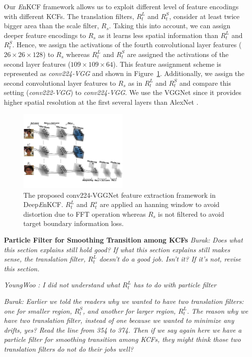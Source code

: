 \documentclass[10pt,twocolumn,letterpaper]{article}
\begin{document}
Our {\it E}nKCF framework allows us to exploit different level of
feature encodings with different KCFs. The translation filters,
$R_{t}^{L}$ and $R_{t}^{S}$, consider at least twice bigger area than
the scale filter, $R_{s}$. Taking this into account, we can assign deeper feature
encodings to $R_{s}$ as it learns less spatial information than
$R_{t}^{L}$ and $R_{t}^{S}$. Hence, we assign the activations of the
fourth convolutional layer features ($26\times26\times128$) to $R_{s}$
whereas $R_{t}^{L}$ and $R_{t}^{S}$ are assigned the activations of
the second layer features ($109\times109\times64$). This feature
assignment scheme is represented as \textit{conv224-VGG} and shown in
Figure~\ref{fig:Filters_CNN}. Additionally, we assign the second
convolutional layer features to $R_{s}$ as in $R_{t}^{L}$ and
$R_{t}^{S}$ and compare this setting (\textit{conv222-VGG}) to
\textit{conv224-VGG}. We use the VGGNet since it provides higher spatial
resolution at the first several layers than AlexNet
\cite{krizhevsky2012imagenet}.

\begin{figure}[!h]
\centering
\includegraphics[width=0.48\textwidth]{./figures/Filters_Details_CNN.pdf}
\caption{The proposed conv224-VGGNet feature extraction framework in Deep{\it E}nKCF. $R_{t}^{L}$ and $R_{t}^{s}$ are applied an 
hanning window to avoid distortion due to FFT operation whereas $R_{s}$ is not filtered to avoid target boundary information loss.}
\label{fig:Filters_CNN}
\end{figure}

\textbf{Particle Filter for Smoothing Transition among KCFs} 
{\it Burak: Does what this section explains still hold good? If what
  this section explains still makes sense, the translation filter,
  $R_{t}^{L}$ doesn't do a good job. Isn't it? If it's not, revise
  this section.}
  
  {\it YoungWoo : I did not understand what $R_{t}^{L}$ has to do with 
  particle filter}

{\it Burak: Earlier we told the readers why we wanted to have two
  translation filters: one for smaller region, $R_{t}^{S}$, and
  another for larger region, $R_{t}^{L}$. The reason why we have two
  translation filter, instead of one because we wanted to minimize any
  drifts, yes? Read the line from 354 to 374. Then if we say again
  here we have a particle filter for smoothing transition among KCFs,
  they might think those two translation filters do not do their jobs
  well?}
  
\end{document}
